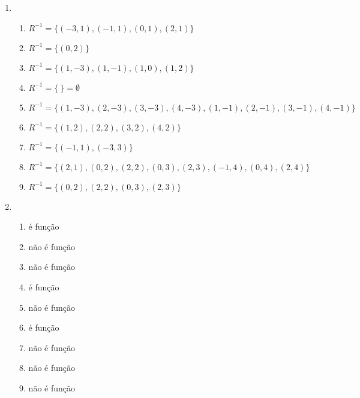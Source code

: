 \documentclass[a4paper]{article}
\begin{document}
\begin{enumerate}
\item \ %
  \begin{enumerate}
  \item $R^{-1} = \{(-3,1), (-1,1), (0,1), (2,1)\}$
  \item $R^{-1} = \{(0,2)\}$
  \item $R^{-1} = \{(1,-3), (1,-1), (1,0), (1,2)\}$
  \item $R^{-1} = \{\ \} = \emptyset$
  \item $R^{-1} = \{(1,-3), (2,-3), (3,-3), (4,-3), (1,-1), (2,-1), (3,-1), (4,-1)\}$
  \item $R^{-1} = \{(1,2), (2,2), (3,2), (4,2)\}$
  \item $R^{-1} = \{(-1,1), (-3,3)\}$
  \item $R^{-1} = \{(2,1), (0,2), (2,2), (0,3), (2,3), (-1,4), (0,4), (2,4)\}$
  \item $R^{-1} = \{(0,2), (2,2), (0,3), (2,3)\}$
  \end{enumerate}

\item \ %
  \begin{enumerate}
  \item é função
  \item não é função
  \item não é função
  \item é função
  \item não é função
  \item é função
  \item não é função
  \item não é função
  \item não é função
  \end{enumerate}

\end{enumerate}
\end{document}
